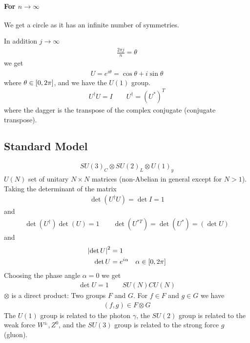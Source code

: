 \documentclass[../main.tex]{subfiles}
\begin{document}
\paragraph{For $n \rightarrow \infty$} We get a circle as it has an infinite number of symmetries.

In addition $j \rightarrow \infty$
\begin{align*}
    \frac{2\pi j}{n} = \theta 
\end{align*}
we get
\begin{align*}
    U = e^{i\theta} = \cos \theta + i \sin \theta
\end{align*}
where $\theta \in \qt[0, 2\pi]$, and we have the $U(1)$ group.
\begin{align*}
    U^\dagger U = I \qquad U^\dagger = (U^*)^T
\end{align*}
where the dagger is the transpose of the complex conjugate (conjugate transpose).

\subsection*{Standard Model}

\begin{align*}
    SU(3)_C \otimes SU(2)_L \otimes U(1)_y
\end{align*}
$U(N)$ set of unitary $N \times N$ matrices (non-Abelian in general except for $N>1$). Taking the 
determinant of the matrix
\begin{align*}
    \det (U^\dagger U) = \det I = 1 
\end{align*}
and 
\begin{align*}
    \det (U^\dagger) \det (U) = 1 \qquad \det (U^{*T}) = \det (U^*) = (\det U)
\end{align*}
and
\begin{align*}
    \abs{\det U}^2 &= 1 \\
    \det U &= e^{i\alpha} \quad \alpha \in [0, 2\pi]
\end{align*}
Choosing the phase angle $\alpha = 0$ we get
\begin{align*}
    \det U = 1 \qquad SU(N) C U(N)
\end{align*}
$\otimes$ is a direct product: Two groups $F$ and $G$. For $f \in F$ and $g \in G$ we have
\begin{align*}
    (f, g) \in F \otimes G
\end{align*}
The $U(1)$ group is related to the photon $\gamma$, the $SU(2)$ group is related to the weak force
$W^\pm, Z^0$, and the $SU(3)$ group is related to the strong force $g$ (gluon).
\end{document}
